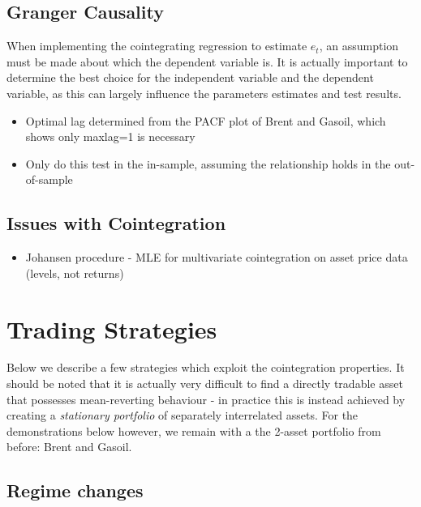 \documentclass[11pt]{article}
\providecommand{\tightlist}{%
      \setlength{\itemsep}{0pt}\setlength{\parskip}{0pt}}
\begin{document}
    
    \subsection{Granger Causality}\label{granger-causality}
    
    
When implementing the cointegrating regression to estimate \(e_t\), an
assumption must be made about which the dependent variable is. It is
actually important to determine the best choice for the independent
variable and the dependent variable, as this can largely influence the
parameters estimates and test results.
\begin{itemize}
\tightlist
\item
  Optimal lag determined from the PACF plot of Brent and Gasoil, which
  shows only maxlag=1 is necessary
\item
  Only do this test in the in-sample, assuming the relationship holds in
  the out-of-sample
\end{itemize}


    \subsection{Issues with Cointegration}\label{issues-with-cointegration}
    
\begin{itemize}
\tightlist
\item
  Johansen procedure - MLE for multivariate cointegration on asset price
  data (levels, not returns)
\end{itemize}


    \section{Trading Strategies}\label{trading-strategies}
    
    Below we describe a few strategies which exploit the cointegration
properties. It should be noted that it is actually very difficult to
find a directly tradable asset that possesses mean-reverting behaviour -
in practice this is instead achieved by creating a \emph{stationary
portfolio} of separately interrelated assets. For the demonstrations
below however, we remain with a the 2-asset portfolio from before: Brent
and Gasoil.

    \subsection{Regime changes}\label{regime-changes}
    
\end{document}
